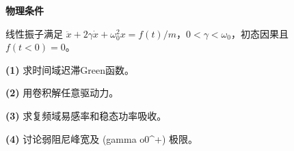 \textbf{物理条件}\par 线性振子满足 \(\ddot x+2\gamma\dot x+\omega_0^2x=f(t)/m\)，\(0<\gamma<\omega_0\)，初态因果且 \(f(t<0)=0\)。
\par\noindent\textbf{(1)} 求时间域迟滞Green函数。
\par\noindent\textbf{(2)} 用卷积解任意驱动力。
\par\noindent\textbf{(3)} 求复频域易感率和稳态功率吸收。
\par\noindent\textbf{(4)} 讨论弱阻尼峰宽及 (gamma	o0\textasciicircum{}+) 极限。

